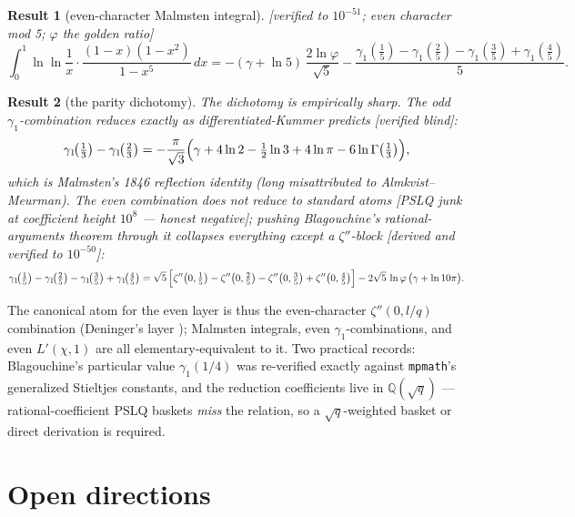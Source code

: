 \documentclass[11pt]{article}
\newtheorem{result}{Result}[section]
\theoremstyle{remark}
\newcommand{\dps}[1]{\textsf{\footnotesize[#1]}}
\begin{document}
\begin{result}[even-character Malmsten integral]\label{res:evenchi}
\dps{verified to $10^{-51}$; even character mod 5; $\varphi$ the golden ratio}
\[
\int_0^1\ln\ln\frac1x\cdot\frac{(1-x)(1-x^2)}{1-x^5}\,dx
=-(\gamma+\ln5)\,\frac{2\ln\varphi}{\sqrt5}
-\frac{\gamma_1(\tfrac15)-\gamma_1(\tfrac25)-\gamma_1(\tfrac35)+\gamma_1(\tfrac45)}{5}.
\]
\end{result}

\begin{result}[the parity dichotomy]\label{res:parity}
The dichotomy is empirically sharp. The \emph{odd} $\gamma_1$-combination reduces exactly
as differentiated-Kummer predicts \dps{verified blind}:
\[
\gamma_1\!\bigl(\tfrac13\bigr)-\gamma_1\!\bigl(\tfrac23\bigr)
=-\frac{\pi}{\sqrt3}\Bigl(\gamma+4\ln2-\tfrac12\ln3+4\ln\pi-6\ln\Gamma\bigl(\tfrac13\bigr)\Bigr),
\]
which is \emph{Malmsten's 1846 reflection identity} \cite{Malmsten} (long misattributed
to Almkvist--Meurman). The \emph{even} combination does \emph{not} reduce to standard atoms
\dps{PSLQ junk at coefficient height $10^8$ --- honest negative}; pushing Blagouchine's
rational-arguments theorem \cite{BlagouchineJNT} through it collapses everything except a $\zeta''$-block
\dps{derived and verified to $10^{-50}$}:
\[
\gamma_1\!\bigl(\tfrac15\bigr)-\gamma_1\!\bigl(\tfrac25\bigr)
-\gamma_1\!\bigl(\tfrac35\bigr)+\gamma_1\!\bigl(\tfrac45\bigr)
=\sqrt5\,\Bigl[\zeta''\bigl(0,\tfrac15\bigr)-\zeta''\bigl(0,\tfrac25\bigr)
-\zeta''\bigl(0,\tfrac35\bigr)+\zeta''\bigl(0,\tfrac45\bigr)\Bigr]
-2\sqrt5\,\ln\varphi\,\bigl(\gamma+\ln10\pi\bigr).
\]
\end{result}

The canonical atom for the even layer is thus the even-character $\zeta''(0,l/q)$
combination (Deninger's layer \cite{Deninger}); Malmsten integrals, even $\gamma_1$-combinations, and even
$L'(\chi,1)$ are all elementary-equivalent to it. Two practical records: Blagouchine's
particular value $\gamma_1(1/4)$ was re-verified exactly against \texttt{mpmath}'s
generalized Stieltjes constants, and the reduction coefficients live in
$\mathbb{Q}(\sqrt q)$ --- rational-coefficient PSLQ baskets \emph{miss} the relation, so a
$\sqrt q$-weighted basket or direct derivation is required.

\section{Open directions}\label{sec:open}
\end{document}
